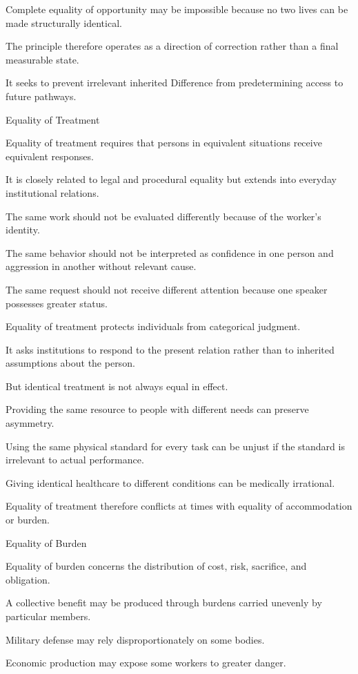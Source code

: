 Complete equality of opportunity may be impossible because no two lives can be made structurally identical.

The principle therefore operates as a direction of correction rather than a final measurable state.

It seeks to prevent irrelevant inherited Difference from predetermining access to future pathways.

Equality of Treatment

Equality of treatment requires that persons in equivalent situations receive equivalent responses.

It is closely related to legal and procedural equality but extends into everyday institutional relations.

The same work should not be evaluated differently because of the worker’s identity.

The same behavior should not be interpreted as confidence in one person and aggression in another without relevant cause.

The same request should not receive different attention because one speaker possesses greater status.

Equality of treatment protects individuals from categorical judgment.

It asks institutions to respond to the present relation rather than to inherited assumptions about the person.

But identical treatment is not always equal in effect.

Providing the same resource to people with different needs can preserve asymmetry.

Using the same physical standard for every task can be unjust if the standard is irrelevant to actual performance.

Giving identical healthcare to different conditions can be medically irrational.

Equality of treatment therefore conflicts at times with equality of accommodation or burden.

Equality of Burden

Equality of burden concerns the distribution of cost, risk, sacrifice, and obligation.

A collective benefit may be produced through burdens carried unevenly by particular members.

Military defense may rely disproportionately on some bodies.

Economic production may expose some workers to greater danger.

